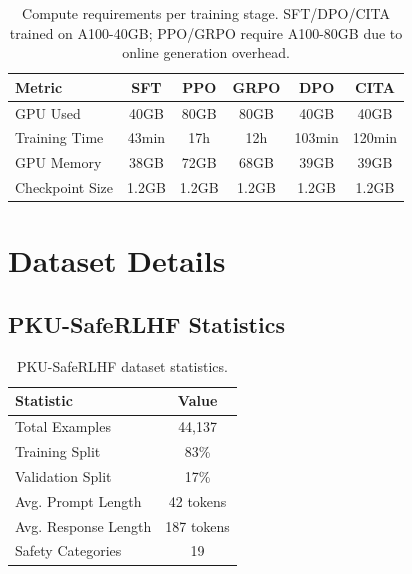\begin{table}[H]
\centering
\scriptsize
\begin{tabular}{@{}lccccc@{}}
\toprule
\textbf{Metric} & \textbf{SFT} & \textbf{PPO} & \textbf{GRPO} & \textbf{DPO} & \textbf{CITA} \\
\midrule
GPU Used & 40GB & 80GB & 80GB & 40GB & 40GB \\
\hline
Training Time & 43min & 17h & 12h & 103min & 120min \\
\hline
GPU Memory & 38GB & 72GB & 68GB & 39GB & 39GB \\
\hline
Checkpoint Size & 1.2GB & 1.2GB & 1.2GB & 1.2GB & 1.2GB \\
\bottomrule
\end{tabular}
\caption{Compute requirements per training stage. SFT/DPO/CITA trained on A100-40GB; PPO/GRPO require A100-80GB due to online generation overhead.}
\label{tab:compute}
\end{table}

\section{Dataset Details}
\label{sec:appendix_dataset}

\subsection{PKU-SafeRLHF Statistics}

\begin{table}[H]
\centering
\small
\begin{tabular}{@{}lc@{}}
\toprule
\textbf{Statistic} & \textbf{Value} \\
\midrule
Total Examples & 44,137 \\
\hline
Training Split & 83\% \\
\hline
Validation Split & 17\% \\
\hline
Avg. Prompt Length & 42 tokens \\
\hline
Avg. Response Length & 187 tokens \\
\hline
Safety Categories & 19 \\
\bottomrule
\end{tabular}
\caption{PKU-SafeRLHF dataset statistics.}
\label{tab:pku_stats}
\end{table}

